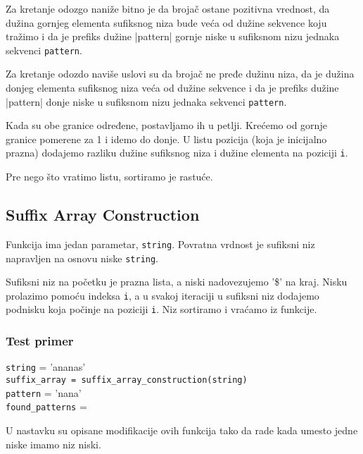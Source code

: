 Za kretanje odozgo naniže bitno je da brojač ostane pozitivna vrednost, da dužina gornjeg elementa sufiksnog niza bude veća od dužine sekvence koju tražimo i da je prefiks dužine |pattern| gornje niske u sufiksnom nizu jednaka sekvenci \texttt{pattern}. 

Za kretanje odozdo naviše uslovi su da brojač ne pređe dužinu niza, da je dužina donjeg elementa sufiksnog niza veća od dužine sekvence i da je prefiks dužine |pattern| donje niske u sufiksnom nizu jednaka sekvenci \texttt{pattern}.

Kada su obe granice određene, postavljamo ih u petlji. Krećemo od gornje granice pomerene za 1 i idemo do donje. U listu pozicija (koja je inicijalno prazna) dodajemo razliku dužine sufiksnog niza i dužine elementa na poziciji \texttt{i}.

Pre nego što vratimo listu, sortiramo je rastuće.




\subsection{Suffix Array Construction}
\label{suffixArrayConstruction}

Funkcija ima jedan parametar, \texttt{string}. Povratna vrdnost je sufiksni niz napravljen na osnovu niske \texttt{string}.

Sufiksni niz na početku je prazna lista, a niski nadovezujemo '\$' na kraj. Nisku prolazimo pomoću indeksa \texttt{i}, a u svakoj iteraciji u sufiksni niz dodajemo podnisku koja počinje na poziciji \texttt{i}. Niz sortiramo i vraćamo iz funkcije.




\subsubsection{Test primer}

\texttt{string} = 'ananas'
\\\texttt{suffix\_array = suffix\_array\_construction(string)} 
\\\texttt{pattern} = 'nana'
\\\texttt{found\_patterns} =


U nastavku su opisane modifikacije ovih funkcija tako da rade kada umesto jedne niske imamo niz niski.

